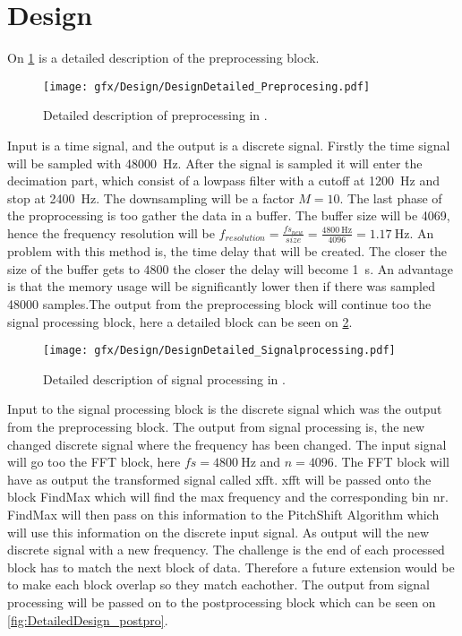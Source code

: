 
\section{Design}
\label{ch:Design}
On \cref{fig:DetailedDesign_prepro} is a detailed description of the preprocessing block.
\begin{figure}
	\centering
	\texttt{[image: gfx/Design/DesignDetailed\_Preprocesing.pdf]}
	\caption{Detailed description of preprocessing in \systemName.}
	\label{fig:DetailedDesign_prepro}
\end{figure}

Input is a time signal, and the output is a discrete signal. Firstly the time signal will be sampled with \SI{48000}{\hertz}. After the signal is sampled it will enter the decimation part, which consist of a lowpass filter with a cutoff at \SI{1200}{\hertz} and stop at \SI{2400}{\hertz}. The downsampling will be a factor $M=10$. The last phase of the proprocessing is too gather the data in a buffer. The buffer size will be 4069, hence the frequency resolution will be $f_{resolution} = \frac{fs_{new}}{size}= \frac{\SI{4800}{\hertz}}{4096}= \SI{1.17}{\hertz}$. An problem with this method is, the time delay that will be created. The closer the size of the buffer gets to $4800$ the closer the delay will become \SI{1}{\second}. An advantage is that the memory usage will be significantly lower then if there was sampled 48000 samples.\newline The output from the preprocessing block will continue too the signal processing block, here a detailed block can be seen on \cref{fig:DetailedDesign_sigpro}.
\begin{figure}
	\centering
	\texttt{[image: gfx/Design/DesignDetailed\_Signalprocessing.pdf]}
	\caption{Detailed description of signal processing in \systemName.}
	\label{fig:DetailedDesign_sigpro}
\end{figure}

Input to the signal processing block is the discrete signal which was the output from the preprocessing block. The output from signal processing is, the new changed discrete signal where the frequency has been changed. The input signal will go too the FFT block, here $fs=\SI{4800}{\hertz}$ and $n=4096$. The FFT block will have as output the transformed signal called xfft. xfft will be passed onto the block FindMax which will find the max frequency and the corresponding bin nr. FindMax will then pass on this information to the PitchShift Algorithm which will use this information on the discrete input signal. As output will the new discrete signal with a new frequency. The challenge is the end of each processed block has to match the next block of data. Therefore a future extension would be to make each block overlap so they match eachother. The output from signal processing will be passed on to the postprocessing block which can be seen on \cref{fig:DetailedDesign_postpro}. 

